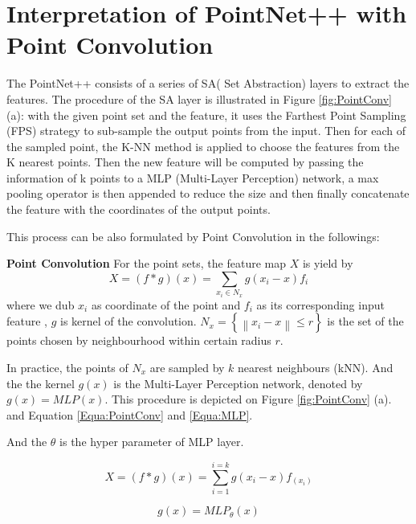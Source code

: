 \documentclass[runningheads]{llncs}
\begin{document}
\section{Interpretation of PointNet++ with Point Convolution}

The PointNet++ \cite{pointnet++} consists of a series of SA( Set Abstraction) layers to extract the features. The procedure of the SA layer is illustrated in Figure \ref{fig:PointConv} (a): with the given point set and the feature, it uses the Farthest Point Sampling (FPS) strategy to sub-sample the output points from the input. %
Then for each of  the sampled point, the K-NN method is applied to choose the features from the K nearest points. Then the new feature will be computed by passing the information of k points  to a MLP (Multi-Layer Perception) network, a max pooling operator is then appended to reduce the size and then finally concatenate the feature with the coordinates of the output points.

This process can be also formulated by Point Convolution in the followings:

\noindent \textbf{Point Convolution} 
For the point sets, the feature map $X$ is yield by  
\begin{equation} 
X= (f*g)(x)= \sum_{x_{i}\in N_{x}} g(x_{i}-x)f_{i} \label{equation:PointConv}
\end{equation}
where we dub $x_{i}$ as coordinate of the point and $f_{i}$ as its corresponding input feature ,  $g$ is kernel of the convolution.  $N_{x} = \left\{  \left\|x_{i}-x  \right\| \leq r \right\}$ is the set of the points chosen by neighbourhood within certain radius $r$.

In practice, the points of $N_{x}$ are sampled by $k$ nearest neighbours (kNN). And the the kernel $g(x)$ is the Multi-Layer Perception network, denoted by $g(x)=MLP(x)$. This procedure is depicted on Figure \ref{fig:PointConv} (a). and Equation \ref{Equa:PointConv} and \ref{Equa:MLP}.

And the $\theta$ is the hyper parameter of MLP layer. 

\begin{equation}
    X = (f*g)(x) = \sum_{i=1}^{i=k}g(x_{i}-x)f_(x_{i})
    \label{Equa:PointConv}
\end{equation}

\begin{equation}
    g(x) = MLP_{\theta}(x)
    \label{Equa:MLP}
\end{equation}
\end{document}
